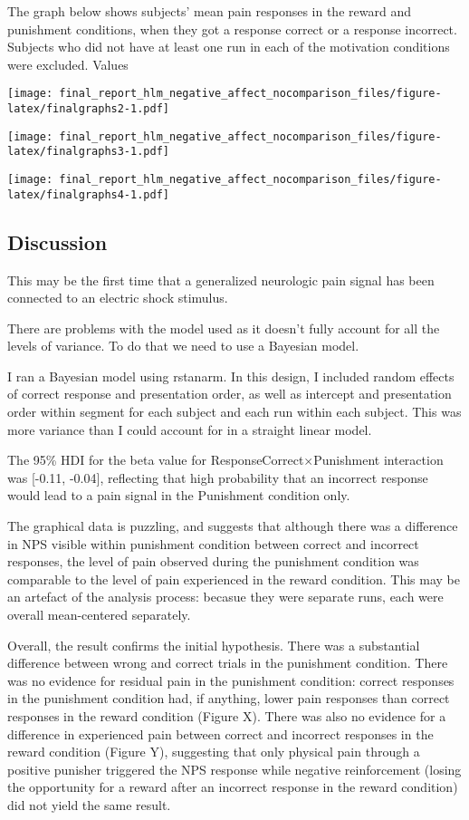 \documentclass[]{article}
\begin{document}
The graph below shows subjects' mean pain responses in the reward and
punishment conditions, when they got a response correct or a response
incorrect. Subjects who did not have at least one run in each of the
motivation conditions were excluded. Values

\texttt{[image: final\_report\_hlm\_negative\_affect\_nocomparison\_files/figure-latex/finalgraphs2-1.pdf]}

\texttt{[image: final\_report\_hlm\_negative\_affect\_nocomparison\_files/figure-latex/finalgraphs3-1.pdf]}

\texttt{[image: final\_report\_hlm\_negative\_affect\_nocomparison\_files/figure-latex/finalgraphs4-1.pdf]}

\subsection{Discussion}\label{discussion}

This may be the first time that a generalized neurologic pain signal has
been connected to an electric shock stimulus.

There are problems with the model used as it doesn't fully account for
all the levels of variance. To do that we need to use a Bayesian model.

I ran a Bayesian model using rstanarm. In this design, I included random
effects of correct response and presentation order, as well as intercept
and presentation order within segment for each subject and each run
within each subject. This was more variance than I could account for in
a straight linear model.

The 95\% HDI for the beta value for ResponseCorrect\(\times\)Punishment
interaction was {[}-0.11, -0.04{]}, reflecting that high probability
that an incorrect response would lead to a pain signal in the Punishment
condition only.

The graphical data is puzzling, and suggests that although there was a
difference in NPS visible within punishment condition between correct
and incorrect responses, the level of pain observed during the
punishment condition was comparable to the level of pain experienced in
the reward condition. This may be an artefact of the analysis process:
becasue they were separate runs, each were overall mean-centered
separately.

Overall, the result confirms the initial hypothesis. There was a
substantial difference between wrong and correct trials in the
punishment condition. There was no evidence for residual pain in the
punishment condition: correct responses in the punishment condition had,
if anything, lower pain responses than correct responses in the reward
condition (Figure X). There was also no evidence for a difference in
experienced pain between correct and incorrect responses in the reward
condition (Figure Y), suggesting that only physical pain through a
positive punisher triggered the NPS response while negative
reinforcement (losing the opportunity for a reward after an incorrect
response in the reward condition) did not yield the same result.
\end{document}
